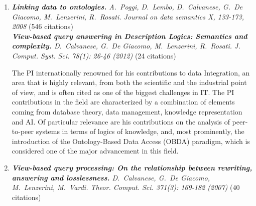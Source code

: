\begin{enumerate}
\item \textit{\textbf{Linking data to ontologies.}
A.\ Poggi, D.\ Lembo, D.\ Calvanese, G.\ De Giacomo, M.\ Lenzerini, R.\ Rosati.
Journal on data semantics X, 133-173, 2008} (546 citations)\\[1ex]
\textit{\textbf{View-based query answering in Description Logics: Semantics and complexity.}
D.\ Calvanese, G.\ De Giacomo, M.\ Lenzerini, R.\ Rosati. J. Comput. Syst. Sci. 78(1): 26-46 (2012)} (24 citations)

The PI internationally renowned for his contributions to data Integration, an area that is highly relevant, from both the scientific and the industrial point of view, and is often cited as one of the biggest challenges in IT. The PI contributions in the field are characterized by a combination of elements coming from database theory, data management, knowledge representation and AI. Of particular relevance are his contributions on the analysis of peer-to-peer systems in terms of logics of knowledge, and, most prominently, the introduction of  the Ontology-Based Data Access (OBDA) paradigm, which is considered one of the major advancement in this field.

\item \textit{\textbf{View-based query processing: On the relationship between rewriting, answering and losslessness.} D.\ Calvanese, G.\ De Giacomo, M.\ Lenzerini, M.\ Vardi.  Theor. Comput. Sci. 371(3): 169-182 (2007)} (40 citations)








\end{enumerate}
